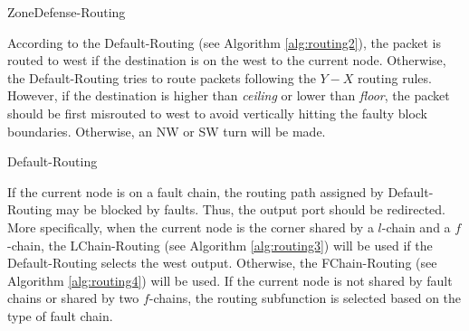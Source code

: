 \begin{algorithm}
    \caption{ZoneDefense-Routing}
    \label{alg:routing1}
\end{algorithm}

According to the Default-Routing (see Algorithm \ref{alg:routing2}), the packet is routed to west if the destination is on the west to the current node. Otherwise, the Default-Routing tries to route packets following the $Y-X$ routing rules. However, if the destination is higher than \textit{ceiling} or lower than \textit{floor}, the packet should be first misrouted to west to avoid vertically hitting the faulty block boundaries. Otherwise, an NW or SW turn will be made.

\begin{algorithm}
    \caption{Default-Routing}
    \label{alg:routing2}
\end{algorithm}

If the current node is on a fault chain, the routing path assigned by Default-Routing may be blocked by faults. Thus, the output port should be redirected. More specifically, when the current node is the corner shared by a $l$-chain and a $f$-chain, the LChain-Routing (see Algorithm \ref{alg:routing3}) will be used if the Default-Routing selects the west output. Otherwise, the FChain-Routing (see Algorithm \ref{alg:routing4}) will be used. If the current node is not shared by fault chains or shared by two $f$-chains, the routing subfunction is selected based on the type of fault chain.

